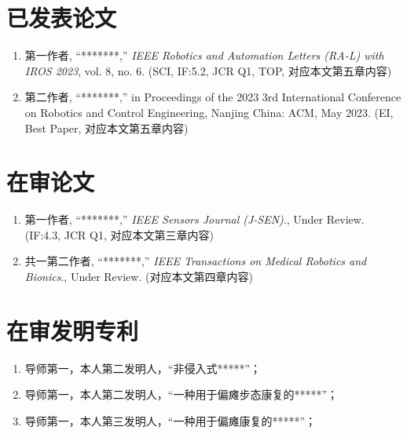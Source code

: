 
\begin{publications}

\section*{已发表论文}

\begin{enumerate}
\item 第一作者, “*******,” \textit{IEEE Robotics and Automation Letters (RA-L) with IROS 2023}, vol. 8, no. 6. (SCI, IF:5.2, JCR Q1, TOP, 对应本文第五章内容)
\item 第二作者, “*******,” in Proceedings of the 2023 3rd International Conference on Robotics and Control Engineering, Nanjing China: ACM, May 2023. (EI, Best Paper, 对应本文第五章内容)
\end{enumerate}

\section*{在审论文}

\begin{enumerate}
\item 第一作者, ``*******,'' \textit{IEEE Sensors Journal (J-SEN)}., Under Review. (IF:4.3, JCR Q1, 对应本文第三章内容)
\item 共一第二作者, ``*******,'' \textit{IEEE Transactions on Medical Robotics and Bionics}., Under Review. (对应本文第四章内容)
\end{enumerate}

\section*{在审发明专利}
\begin{enumerate}
\item 导师第一，本人第二发明人，“非侵入式*****”；
\item 导师第一，本人第二发明人，“一种用于偏瘫步态康复的*****”；
\item 导师第一，本人第三发明人，“一种用于偏瘫康复的*****”；
\end{enumerate}

\end{publications}
